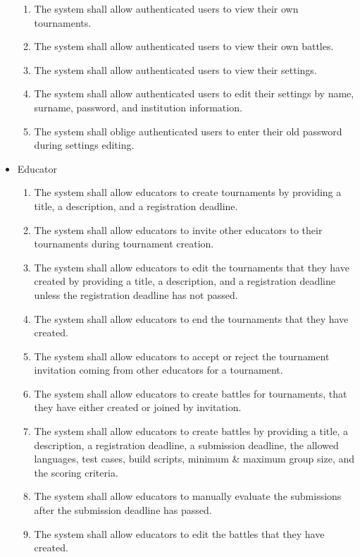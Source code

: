 \begin{itemize}
\begin{enumerate}
  \item The system shall allow authenticated users to view their own tournaments. 
  \item The system shall allow authenticated users to view their own battles. 
  \item The system shall allow authenticated users to view their settings.
  \item The system shall allow authenticated users to edit their settings by name, surname, password, and institution information.
  \item The system shall oblige authenticated users to enter their old password during settings editing.

	\end{enumerate}
	\item Educator
        \begin{enumerate}[resume]
            \item The system shall allow educators to create tournaments by providing a title, a description, and a registration deadline.
            \item The system shall allow educators to invite other educators to their tournaments during tournament creation.
            \item The system shall allow educators to edit the tournaments that they have created by providing a title, a description, and a registration deadline unless the registration deadline has not passed.
            \item The system shall allow educators to end the tournaments that they have created.
            \item The system shall allow educators to accept or reject the tournament invitation coming from other educators for a tournament.
            \item The system shall allow educators to create battles for tournaments, that they have either created or joined by invitation. 
            \item The system shall allow educators to create battles by providing a title, a description, a registration deadline, a submission deadline, the allowed languages, test cases, build scripts, minimum \& maximum group size, and the scoring criteria.
		\item The system shall allow educators to manually evaluate the submissions after the submission deadline has passed.
            \item The system shall allow educators to edit the battles that they have created.
	\end{enumerate}




\end{itemize}
